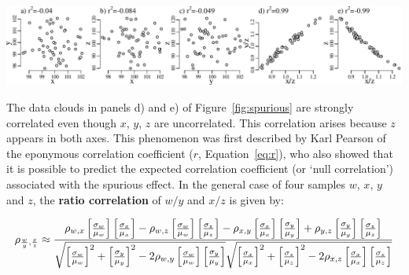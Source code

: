 \begin{enumerate}
\noindent\begin{minipage}[t][][b]{\textwidth-27pt}
  \includegraphics[width=\textwidth]{../figures/spurious.pdf}
  \label{fig:spurious}
\end{minipage}

The data clouds in panels d) and e) of Figure~\ref{fig:spurious} are
strongly correlated even though $x$, $y$, $z$ are uncorrelated.  This
correlation arises because $z$ appears in both axes.  This phenomenon
was first described by Karl Pearson of the eponymous correlation
coefficient ($r$, Equation~\ref{eq:r}), who also showed that it is
possible to predict the expected correlation coefficient (or `null
correlation') associated with the spurious effect. In the general case
of four samples $w$, $x$, $y$ and $z$, the \textbf{ratio correlation}
of $w/y$ and $x/z$ is given by:

\begin{equation}
  \noindent \rho_{\frac{w}{y},\frac{x}{z}} \approx
  \frac{\rho_{w,x}\left[\frac{\sigma_w}{\mu_w}\right]
    \left[\frac{\sigma_x}{\mu_x}\right] -
    \rho_{w,z}\left[\frac{\sigma_w}{\mu_w}\right]
    \left[\frac{\sigma_z}{\mu_z}\right] -
    \rho_{x,y}\left[\frac{\sigma_x}{\mu_x}\right]
    \left[\frac{\sigma_y}{\mu_y}\right] +
    \rho_{y,z}\left[\frac{\sigma_y}{\mu_y}\right]
    \left[\frac{\sigma_z}{\mu_z}\right]
  }{
    \sqrt{\left[\frac{\sigma_w}{\mu_w}\right]^2 +
      \left[\frac{\sigma_y}{\mu_y}\right]^2 -
      2 \rho_{w,y}\left[\frac{\sigma_w}{\mu_w}\right]
      \left[\frac{\sigma_y}{\mu_y}\right]}
    \sqrt{\left[\frac{\sigma_x}{\mu_x}\right]^2 +
      \left[\frac{\sigma_z}{\mu_z}\right]^2 -
      2 \rho_{x,z}\left[\frac{\sigma_x}{\mu_x}\right]
      \left[\frac{\sigma_z}{\mu_z}\right]
    }
  }
  \label{eq:spurious}
\end{equation}


\end{enumerate}
